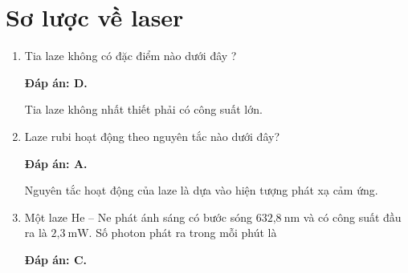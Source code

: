 \section{Sơ lược về laser}
\begin{enumerate}[label=\bfseries Câu \arabic*:]

\item {}
		\cauhoi
	{Tia laze không có đặc điểm nào dưới đây ?	
	}
	
	\loigiai
	{		\textbf{Đáp án: D.}
		
Tia laze không nhất thiết phải có công suất lớn.
		
	}
	
\item {} 
		\cauhoi
	{Laze rubi hoạt động theo nguyên tắc nào dưới đây?
	}
	
	\loigiai
	{		\textbf{Đáp án: A.}
		
Nguyên tắc hoạt động của laze là dựa vào hiện tượng phát xạ cảm ứng.
		
	}
	
	\item {}
		\cauhoi
	{Một laze He – Ne phát ánh sáng có bước sóng $\text{632,8}\ \text{nm}$ và có công suất đầu ra là $\text{2,3}\ \text{mW}$. Số photon phát ra trong mỗi phút là
	}
	
	\loigiai
	{		\textbf{Đáp án: C.}

}
\end{enumerate}
